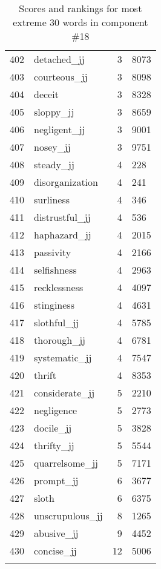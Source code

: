 \begin{longtable}[!htbp]{| rlr@{.}l |}
    402 & detached\_jj & 3 & 8073 \\
    403 & courteous\_jj & 3 & 8098 \\
    404 & deceit & 3 & 8328 \\
    405 & sloppy\_jj & 3 & 8659 \\
    406 & negligent\_jj & 3 & 9001 \\
    407 & nosey\_jj & 3 & 9751 \\
    408 & steady\_jj & 4 & 228 \\
    409 & disorganization & 4 & 241 \\
    410 & surliness & 4 & 346 \\
    411 & distrustful\_jj & 4 & 536 \\
    412 & haphazard\_jj & 4 & 2015 \\
    413 & passivity & 4 & 2166 \\
    414 & selfishness & 4 & 2963 \\
    415 & recklessness & 4 & 4097 \\
    416 & stinginess & 4 & 4631 \\
    417 & slothful\_jj & 4 & 5785 \\
    418 & thorough\_jj & 4 & 6781 \\
    419 & systematic\_jj & 4 & 7547 \\
    420 & thrift & 4 & 8353 \\
    421 & considerate\_jj & 5 & 2210 \\
    422 & negligence & 5 & 2773 \\
    423 & docile\_jj & 5 & 3828 \\
    424 & thrifty\_jj & 5 & 5544 \\
    425 & quarrelsome\_jj & 5 & 7171 \\
    426 & prompt\_jj & 6 & 3677 \\
    427 & sloth & 6 & 6375 \\
    428 & unscrupulous\_jj & 8 & 1265 \\
    429 & abusive\_jj & 9 & 4452 \\
    430 & concise\_jj & 12 & 5006 \\
    \hline
    \caption{Scores and rankings for most extreme 30 words in component \#18} \\
\end{longtable}
